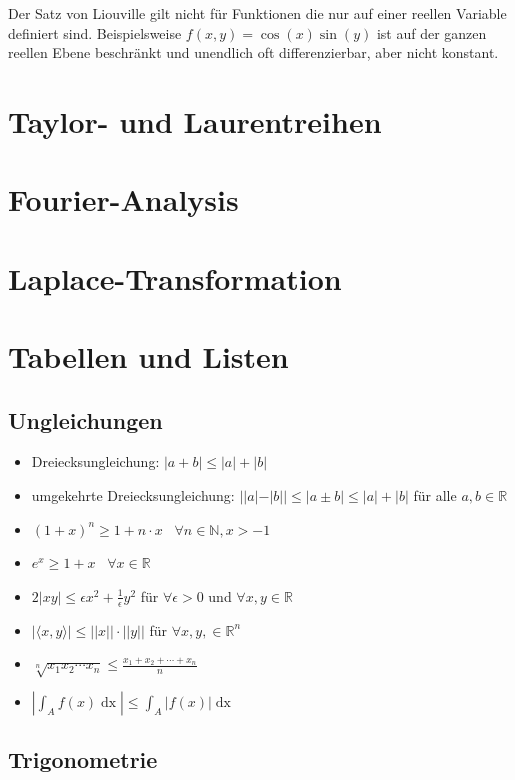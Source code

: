 \documentclass[a4paper,10pt]{article}
\def\R{\mathbb{R}}
\begin{document}
Der Satz von Liouville gilt nicht für Funktionen die nur auf einer reellen Variable definiert sind. Beispielsweise $f(x, y) = \cos(x) \sin(y)$ ist auf der ganzen reellen Ebene beschränkt und unendlich oft differenzierbar, aber nicht konstant.

\section{Taylor- und Laurentreihen}

\section{Fourier-Analysis}

\section{Laplace-Transformation}

\section{Tabellen und Listen}

\subsection{Ungleichungen}

\begin{itemize}
  \item Dreiecksungleichung: $|a + b| \leq |a| + |b|$
  \item umgekehrte Dreiecksungleichung: $||a| - |b|| \leq |a \pm b| \leq |a| + |b|$ für alle $a,b \in \R$
  \item $(1+x)^n \geq 1+ n\cdot x$ \, $\forall n\in \mathbb{N}, x > -1$
  \item $e^x \geq 1 + x$ \, $\forall x\in \mathbb{R}$
  \item $2|xy| \leq \epsilon x^2 + \frac{1}{\epsilon} y^2$ für $\forall \epsilon > 0$ und $\forall x,y \in \mathbb{R}$
  \item $|\langle x,y \rangle| \leq ||x|| \cdot ||y||$ für $\forall x,y, \in \mathbb{R}^n$
  \item $\sqrt[n]{x_1 x_2 \cdots x_n} \leq \frac{x_1 + x_2 + \cdots + x_n}{n}$
  \item $\left| \int_A f(x) \mathop{dx}\right| \le \int_A \left|f(x)\right| \mathop{dx}$
\end{itemize}

\subsection{Trigonometrie}
\end{document}
